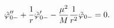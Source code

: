 \begin{equation}
\tilde \varphi_{0-}'' + {1 \over r} \tilde \varphi_{0-}'
- {\mu^2 \over M} {1 \over r^2} \tilde\varphi_{0-} = 0.
\label{eq_r0}
\end{equation}


